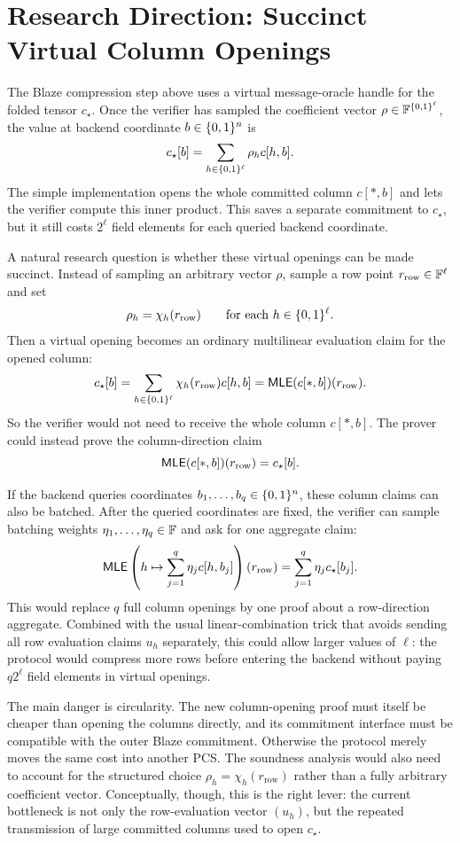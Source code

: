 \section{Research Direction: Succinct Virtual Column Openings}

The Blaze compression step above uses a virtual message-oracle handle for the
folded tensor $c_\star$.  Once the verifier has sampled the coefficient vector
$\rho\in\mathbb{F}^{\{0,1\}^\ell}$, the value at backend coordinate $b\in\{0,1\}^n$ is
\[
  c_\star[b]=\sum_{h\in\{0,1\}^\ell}\rho_h c[h,b].
\]
The simple implementation opens the whole committed column $c[\ast,b]$ and lets
the verifier compute this inner product.  This saves a separate commitment to
$c_\star$, but it still costs $2^\ell$ field elements for each queried backend
coordinate.

A natural research question is whether these virtual openings can be made
succinct.  Instead of sampling an arbitrary vector $\rho$, sample a row point
$r_{\mathrm{row}}\in\mathbb{F}^\ell$ and set
\[
  \rho_h=\chi_h(r_{\mathrm{row}})
  \qquad\text{for each }h\in\{0,1\}^\ell.
\]
Then a virtual opening becomes an ordinary multilinear evaluation claim for the
opened column:
\[
  c_\star[b]
  =
  \sum_{h\in\{0,1\}^\ell}\chi_h(r_{\mathrm{row}})c[h,b]
  =
  \mathsf{MLE}(c[\ast,b])(r_{\mathrm{row}}).
\]
So the verifier would not need to receive the whole column $c[\ast,b]$.  The
prover could instead prove the column-direction claim
\[
  \mathsf{MLE}(c[\ast,b])(r_{\mathrm{row}})=c_\star[b].
\]

If the backend queries coordinates $b_1,\ldots,b_q\in\{0,1\}^n$, these column claims
can also be batched.  After the queried coordinates are fixed, the verifier can
sample batching weights $\eta_1,\ldots,\eta_q\in\mathbb{F}$ and ask for one aggregate
claim:
\[
  \mathsf{MLE}\left(
    h\mapsto \sum_{j=1}^q \eta_j c[h,b_j]
  \right)(r_{\mathrm{row}})
  =
  \sum_{j=1}^q \eta_j c_\star[b_j].
\]
This would replace $q$ full column openings by one proof about a
row-direction aggregate.  Combined with the usual linear-combination trick that
avoids sending all row evaluation claims $u_h$ separately, this could allow
larger values of $\ell$: the protocol would compress more rows before entering
the backend without paying $q2^\ell$ field elements in virtual openings.

The main danger is circularity.  The new column-opening proof must itself be
cheaper than opening the columns directly, and its commitment interface must be
compatible with the outer Blaze commitment.  Otherwise the protocol merely moves
the same cost into another PCS.  The soundness analysis would also need to
account for the structured choice
$\rho_h=\chi_h(r_{\mathrm{row}})$ rather than a fully arbitrary coefficient
vector.  Conceptually, though, this is the right lever: the current bottleneck is
not only the row-evaluation vector $(u_h)$, but the repeated transmission of
large committed columns used to open $c_\star$.

